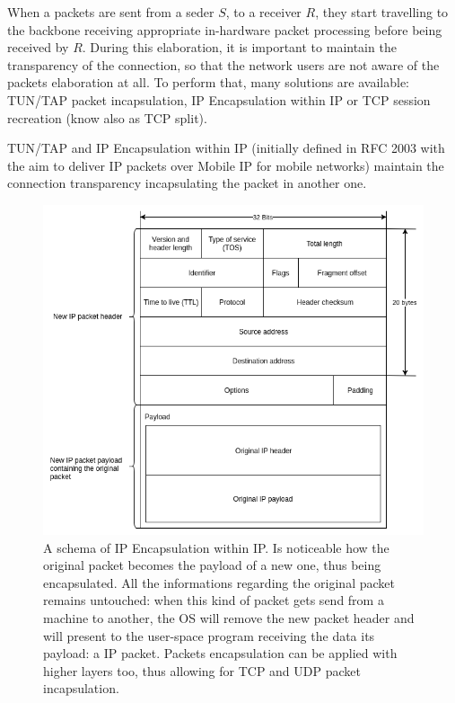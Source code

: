 \documentclass[10pt]{book}
\begin{document}
When a packets are sent from a seder $S$, to a receiver $R$, they start
travelling to the backbone receiving appropriate in-hardware packet 
processing before being received by $R$. During this elaboration, it is 
important to maintain the transparency of the connection, so that the network 
users are not aware of the packets elaboration at all. To perform that, many 
solutions are available: TUN/TAP packet incapsulation, IP Encapsulation within 
IP or TCP session recreation (know also as TCP split).

TUN/TAP and IP Encapsulation within IP (initially defined in RFC 2003 with the 
aim to deliver IP packets over Mobile IP for mobile networks) maintain the 
connection transparency incapsulating the packet in another one.
\begin{figure}[t]
  \centering
  \includegraphics[scale=0.5]{IPoverIP}
  \caption[IP Encapsulation within IP packet schema]{A schema of IP 
Encapsulation within IP. Is noticeable how the original packet becomes the 
payload of a new one, thus being encapsulated. All the informations regarding 
the original packet remains untouched: when this kind of packet gets send 
from a machine to another, the OS will remove the new packet header and will 
present to the user-space program receiving the data its payload: a IP 
packet. Packets encapsulation can be applied with higher layers too, thus 
allowing for TCP and UDP packet incapsulation.}
  \label{chap:prjan:img:ip_over_ip}
\end{figure}
\end{document}
